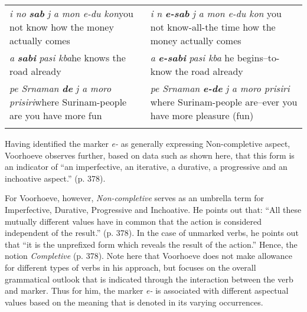\begin{table}[t]
\begin{tabularx}{\textwidth}{QQ}
    \tablevspace \textit{i no} \textbf{\textit{sab}} \textit{j a mon
      e-du kon}\newline you not know how the money actually comes &
    \textit{i n} \textbf{\textit{e-sab}} \textit{j a mon e-du
      kon}\newline
    you not know-all-the time how the money actually    comes\\

    \tablevspace \textit{a} \textbf{\textit{sabi}} \textit{pasi
      kba}\newline he knows the road already & \textit{a}
    \textbf{\textit{e-sabi}} \textit{pasi kba}\newline
    he begins–to-know the road already \\

    \tablevspace \textit{pe Srnaman} \textbf{\textit{de}} \textit{j a
      moro prisiri}\newline where Surinam-people are you have more fun
    & \textit{pe Srnaman} \textbf{\textit{e-de}} \textit{j a moro
      prisiri}\newline
    where Surinam-people are–ever you have more pleasure (fun)\\
    \lspbottomrule
  \end{tabularx}
\end{table}

Having identified the marker \textit{e-} as generally expressing
Non-completive aspect, Voorhoeve observes further, based on data such
as shown here, that this form is an indicator of “an imperfective, an
iterative, a durative, a progressive and an inchoative aspect.”
(p. 378).

For Voorhoeve, however, \textit{Non-completive} serves as an umbrella
term for Imperfective, Durative, Progressive and Inchoative.  He
points out that: “All these mutually different values have in common
that the action is considered independent of the result.” (p. 378).
In the case of unmarked verbs, he points out that “it is the
unprefixed form which reveals the result of the action.”  Hence, the
notion \textit{Completive} (p. 378).  Note here that Voorhoeve does
not make allowance for different types of verbs in his approach, but
focuses on the overall grammatical outlook that is indicated through
the interaction between the verb and marker.  Thus for him, the marker
\textit{e-} is associated with different aspectual values based on the
meaning that is denoted in its varying occurrences.

